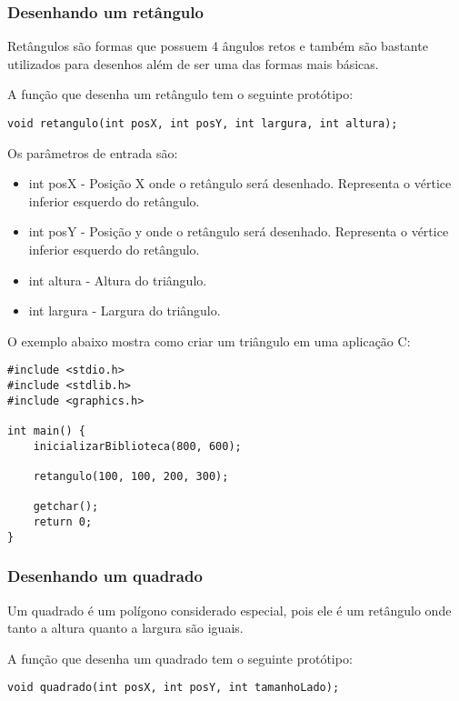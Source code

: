 \documentclass[12pt, %
openright,
oneside, %
a4paper,    %
brazil]{facom-ufu-abntex2}
\begin{document}
\subsubsection{Desenhando um retângulo}
Retângulos são formas que possuem 4 ângulos retos e também são bastante utilizados para desenhos além de ser uma das formas mais básicas.

A função que desenha um retângulo tem o seguinte protótipo:

\begin{lstlisting}
void retangulo(int posX, int posY, int largura, int altura);
\end{lstlisting}

Os parâmetros de entrada são:

\begin{itemize}
    \item int posX - Posição X onde o retângulo será desenhado. Representa o vértice inferior esquerdo do retângulo.
    \item int posY - Posição y onde o retângulo será desenhado. Representa o vértice inferior esquerdo do retângulo.
    \item int altura - Altura do triângulo.
    \item int largura - Largura do triângulo.
\end{itemize}

O exemplo abaixo mostra como criar um triângulo em uma aplicação C:

\begin{lstlisting}
#include <stdio.h>
#include <stdlib.h>
#include <graphics.h>

int main() {
    inicializarBiblioteca(800, 600);

    retangulo(100, 100, 200, 300);

    getchar();
    return 0;
}
\end{lstlisting}

\subsubsection{Desenhando um quadrado}
Um quadrado é um polígono considerado especial, pois ele é um retângulo onde tanto a altura quanto a largura são iguais.

A função que desenha um quadrado tem o seguinte protótipo:

\begin{lstlisting}
void quadrado(int posX, int posY, int tamanhoLado);
\end{lstlisting}
\end{document}
